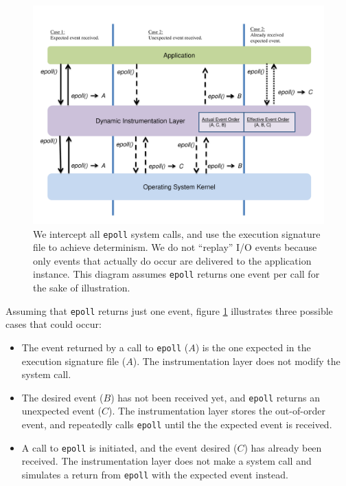 \begin{figure}[h]
  \center
  \includegraphics[trim=0cm 1.25cm 0cm 0.75cm, scale=0.60]{epoll.pdf}
  \caption[Reordering I/O events using Pin]%
    {We intercept all \texttt{epoll} system calls,
    and use the execution signature file to
    achieve determinism. We do not ``replay'' I/O
    events because only events that actually do occur
    are delivered to the application instance. This
    diagram assumes \texttt{epoll} returns one event
    per call for the sake of illustration. }       
  \label{ch3:reorderfig}
\end{figure} 
              
Assuming that \texttt{epoll} returns just one event, figure
\ref{ch3:reorderfig} illustrates three possible cases that could occur:
\begin{itemize}
    \item The event returned by a call to \texttt{epoll} ($A$) is the one expected
    in the execution signature file ($A$). The instrumentation layer
    does not modify the system call.
    \item The desired event ($B$) has not been received yet,
    and \texttt{epoll} returns an unexpected event ($C$).
    The instrumentation layer stores the out-of-order event,
    and repeatedly calls \texttt{epoll} until the 
    the expected event is received.
    \item  A call to \texttt{epoll} is initiated, and the
    event desired ($C$) has already been received.
    The instrumentation layer does not 
    make a system call and simulates a return
    from \texttt{epoll} with the expected event instead.
\end{itemize}

